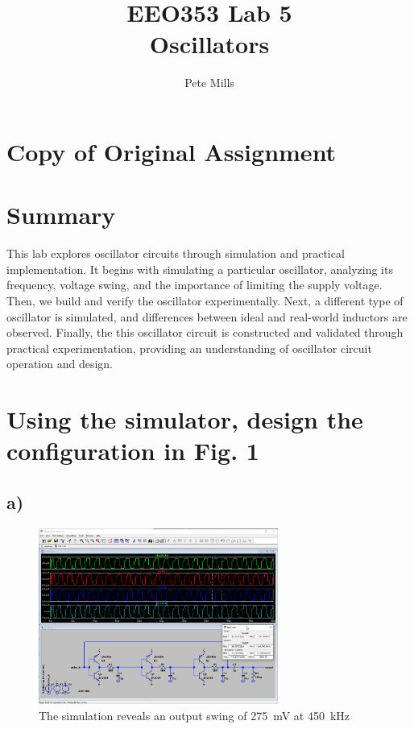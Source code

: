\documentclass{article}
\begin{document}
	
	
	\title{EEO353 Lab 5\\ Oscillators}
	\author{Pete Mills}
	
	\maketitle
	
	\section*{Copy of Original Assignment}
	
	
	
	
	\section*{Summary}
	
	This lab explores oscillator circuits through simulation and practical implementation. It begins with simulating a particular oscillator, analyzing its frequency, voltage swing, and the importance of limiting the supply voltage. Then, we build and verify the oscillator experimentally. Next, a different type of oscillator is simulated, and differences between ideal and real-world inductors are observed. Finally, the this oscillator circuit is constructed and validated through practical experimentation, providing an understanding of oscillator circuit operation and design.
	
	
	

	\section{Using the simulator, design the configuration in Fig. 1}

	\subsection*{a)}
	
	\begin{figure}[H]
	    \centering
	    \includegraphics[width=0.7\textwidth]{sim1}
	    \caption{The simulation reveals an output swing of \SI{275}{\mV} at \SI{450}{\kilo\hertz}}
	\end{figure}
	
\end{document}
